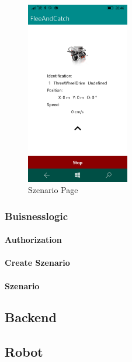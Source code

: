 \begin{figure}[h]
	\begin{center}
		\includegraphics[width=0.4\textwidth]{images/implementation/szenario.png}
	\end{center}	
	\caption{Szenario Page}
	\label{fig:szenario}
\end{figure}

\newpage
\subsubsection{Buisnesslogic} %

\paragraph{Authorization}

\paragraph{Create Szenario}

\paragraph{Szenario}

\newpage
\subsection{Backend}

\subsection{Robot}


